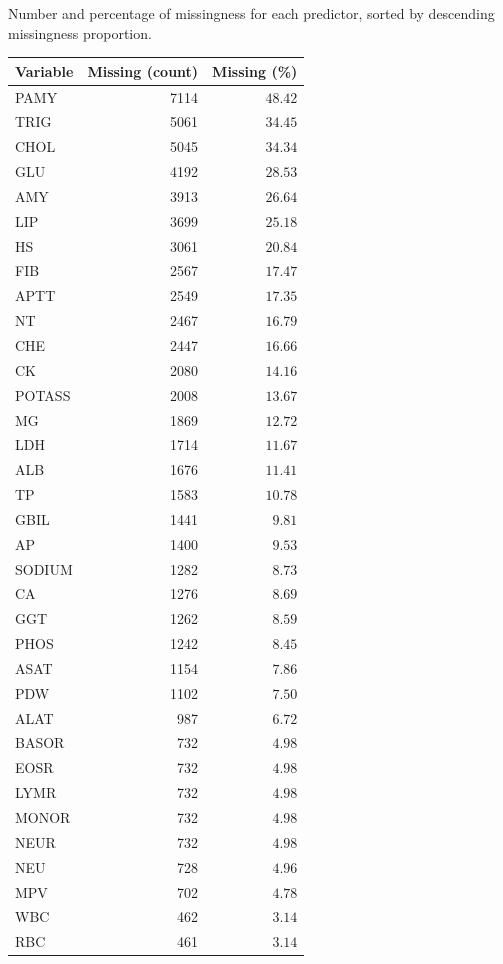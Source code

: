 \documentclass[
  letterpaper,
  DIV=11,
  numbers=noendperiod]{scrreport}
\begin{document}
Number and percentage of missingness for each predictor, sorted by
descending missingness proportion.

\captionsetup[table]{labelformat=empty,skip=1pt}
\begin{longtable}{lrr}
\toprule
\textbf{Variable} & \textbf{Missing (count)} & \textbf{Missing (\%)} \\ 
\midrule
PAMY & 7114 & $48.42$ \\ 
TRIG & 5061 & $34.45$ \\ 
CHOL & 5045 & $34.34$ \\ 
GLU & 4192 & $28.53$ \\ 
AMY & 3913 & $26.64$ \\ 
LIP & 3699 & $25.18$ \\ 
HS & 3061 & $20.84$ \\ 
FIB & 2567 & $17.47$ \\ 
APTT & 2549 & $17.35$ \\ 
NT & 2467 & $16.79$ \\ 
CHE & 2447 & $16.66$ \\ 
CK & 2080 & $14.16$ \\ 
POTASS & 2008 & $13.67$ \\ 
MG & 1869 & $12.72$ \\ 
LDH & 1714 & $11.67$ \\ 
ALB & 1676 & $11.41$ \\ 
TP & 1583 & $10.78$ \\ 
GBIL & 1441 & $9.81$ \\ 
AP & 1400 & $9.53$ \\ 
SODIUM & 1282 & $8.73$ \\ 
CA & 1276 & $8.69$ \\ 
GGT & 1262 & $8.59$ \\ 
PHOS & 1242 & $8.45$ \\ 
ASAT & 1154 & $7.86$ \\ 
PDW & 1102 & $7.50$ \\ 
ALAT & 987 & $6.72$ \\ 
BASOR & 732 & $4.98$ \\ 
EOSR & 732 & $4.98$ \\ 
LYMR & 732 & $4.98$ \\ 
MONOR & 732 & $4.98$ \\ 
NEUR & 732 & $4.98$ \\ 
NEU & 728 & $4.96$ \\ 
MPV & 702 & $4.78$ \\ 
WBC & 462 & $3.14$ \\ 
RBC & 461 & $3.14$ \\ 

\end{longtable}
\end{document}

